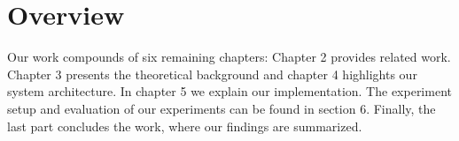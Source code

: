 
\section{Overview}

Our work compounds of six remaining chapters:
Chapter 2 provides related work. Chapter 3 presents the theoretical background and chapter 4 highlights our system architecture. In chapter 5 we explain our implementation. The experiment setup and evaluation of our experiments can be found in section 6. Finally, the last part concludes the work, where our findings are summarized.